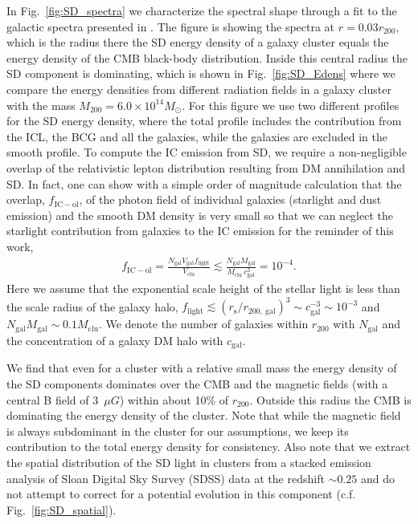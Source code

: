 \documentclass[10pt,aps,pra,reprint,amsmath,amsfonts,amssymb,showpacs,nofootinbib,floatfix]{revtex4-1}
\newcommand{\rmn}{\mathrm}
\newcommand{\msun}{M_\odot}
\newcommand{\rvir}{r_{200}}
\newcommand{\mvir}{M_{200}}
\begin{document}
In Fig.~\ref{fig:SD_spectra} we characterize the spectral shape
through a fit to the galactic spectra presented in
\cite{2006ApJ...648L..29P}. The figure is showing the spectra at
$r=0.03\rvir$, which is the radius there the SD energy density of a
galaxy cluster equals the energy density of the CMB black-body
distribution. Inside this central radius the SD component is
dominating, which is shown in Fig.~\ref{fig:SD_Edens} where we compare
the energy densities from different radiation fields in a galaxy
cluster with the mass $\mvir=6.0\times10^{14}\msun$. For this figure we
use two different profiles for the SD energy density, where the total
profile includes the contribution from the ICL, the BCG and all the
galaxies, while the galaxies are excluded in the smooth profile. To
compute the IC emission from SD, we require a non-negligible overlap
of the relativistic lepton distribution resulting from DM annihilation
and SD. In fact, one can show with a simple order of magnitude
calculation that the overlap, $f_\rmn{IC-ol}$, of the photon field of
individual galaxies (starlight and dust emission) and the smooth DM
density is very small so that we can neglect the starlight
contribution from galaxies to the IC emission for the reminder of this
work,
\begin{eqnarray}
\label{eq:SD_overlap}
f_\rmn{IC-ol} = \frac{N_\rmn{gal} V_\rmn{gal} f_\rmn{light}}{V_\rmn{clu}}
\lesssim \frac{N_\rmn{gal} M_\rmn{gal}}{M_\rmn{clu}\,c_\rmn{gal}^{3}}=10^{-4}.
\end{eqnarray}
Here we assume that the exponential scale height of the stellar light
is less than the scale radius of the galaxy halo, $f_\rmn{light}
\lesssim (r_\rmn{s} / r_{200,~\rmn{gal}})^3 \sim c_\rmn{gal}^{-3} \sim
10^{-3}$ and $N_\rmn{gal} M_\rmn{gal} \sim 0.1 M_\rmn{clu}$. We denote
the number of galaxies within $\rvir$ with $N_\rmn{gal}$ and the
concentration of a galaxy DM halo with $c_\rmn{gal}$.

We find that even for a cluster with a relative small mass the energy
density of the SD components dominates over the CMB and the magnetic
fields (with a central B field of 3~$\mu G$) within about 10\% of
$\rvir$. Outside this radius the CMB is dominating the energy density
of the cluster. Note that while the magnetic field is always
subdominant in the cluster for our assumptions, we keep its
contribution to the total energy density for consistency. Also note
that we extract the spatial distribution of the SD light in clusters
from a stacked emission analysis of Sloan Digital Sky Survey (SDSS)
data at the redshift $\sim 0.25$ \cite{2005MNRAS.358..949Z} and do not
attempt to correct for a potential evolution in this component
(c.f. Fig.~\ref{fig:SD_spatial}).
\end{document}
